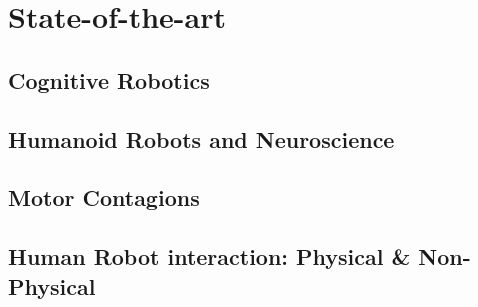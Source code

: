 \chapter{State-of-the-art}




\section{Cognitive Robotics}

\section{Humanoid Robots and Neuroscience}

\section{Motor Contagions}

\section{Human Robot interaction: Physical \& Non-Physical}

